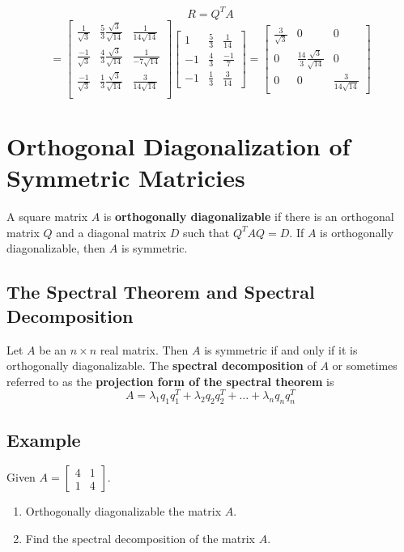 $$R = Q^TA$$
$$= \begin{bmatrix}
    \frac{1}{\sqrt{3}}&\frac{5}{3}\frac{\sqrt{3}}{\sqrt{14}}&\frac{1}{14\sqrt{14}}\\
    \frac{-1}{\sqrt{3}}&\frac{4}{3}\frac{\sqrt{3}}{\sqrt{14}}&\frac{1}{-7\sqrt{14}}\\
    \frac{-1}{\sqrt{3}}&\frac{1}{3}\frac{\sqrt{3}}{\sqrt{14}}&\frac{3}{14\sqrt{14}}\\
\end{bmatrix}\begin{bmatrix}
    1&\frac{5}{3}&\frac{1}{14}\\-1&\frac{4}{3}&\frac{-1}{7}\\-1&\frac{1}{3}&\frac{3}{14}
\end{bmatrix} = \begin{bmatrix}
    \frac{3}{\sqrt{3}}&0&0\\
    0&\frac{14}{3}\frac{\sqrt{3}}{\sqrt{14}}&0\\
    0&0&\frac{3}{14\sqrt{14}}
\end{bmatrix}$$

\section{Orthogonal Diagonalization of Symmetric Matricies}
A square matrix $A$ is \textbf{orthogonally diagonalizable} if there is an orthogonal matrix $Q$ and a diagonal matrix $D$ such that $Q^TAQ = D$.
If $A$ is orthogonally diagonalizable, then $A$ is symmetric.

\subsection*{The Spectral Theorem and Spectral Decomposition}
Let $A$ be an $n\times n$ real matrix. Then $A$ is symmetric if and only if it is orthogonally diagonalizable.
The \textbf{spectral decomposition} of $A$ or sometimes referred to as the \textbf{projection form of the spectral theorem} is
$$A = \lambda_1q_1q^T_1 + \lambda_2q_2q^T_2 + \dots + \lambda_nq_nq^T_n$$

\subsection*{Example}
Given $A = \begin{bmatrix}
    4&1\\1&4
\end{bmatrix}. $\begin{enumerate}
    \item Orthogonally diagonalizable the matrix $A$.
    \item Find the spectral decomposition of the matrix $A$.
\end{enumerate}

